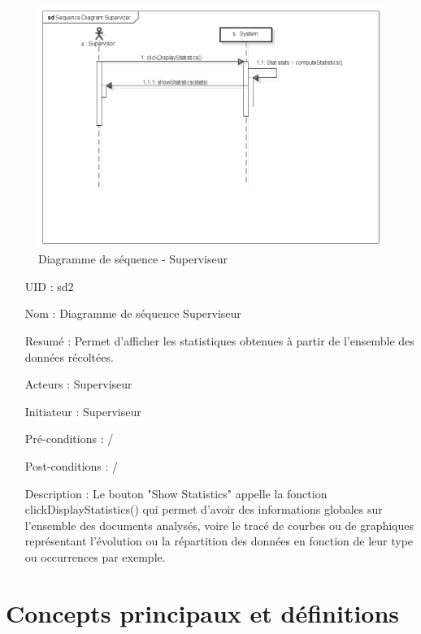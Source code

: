 \begin{figure}
	\begin{center}
		\includegraphics[scale = 0.4]{img/seqDiagSupervizer.png}
	\end{center}
	\caption{Diagramme de séquence - Superviseur}
	\label{seqDiagSupervizer}
\end{figure}

\begin{enumerate}[label=\bfseries]
	\item[{UID :}] sd2
	\item[{Nom :}] Diagramme de séquence Superviseur
	\item[{Resumé :}]  Permet d'afficher les statistiques obtenues à partir de l'ensemble des données récoltées.
	\item[{Acteurs :}] Superviseur
	\item[{Initiateur :}] Superviseur
	\item[{Pré-conditions :}]  /
	\item[{Post-conditions :}]  /
	\item[{Description :}]
	Le bouton "Show Statistics" appelle la fonction clickDisplayStatistics() qui permet d'avoir des informations globales sur l'ensemble des documents analysés, voire le tracé de courbes ou de graphiques représentant l'évolution ou la répartition des données en fonction de leur type ou occurrences par exemple.
\end{enumerate}

\section{Concepts principaux et définitions}

